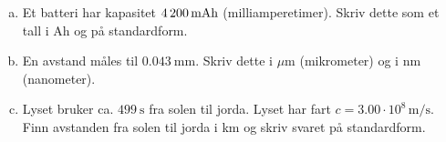 %
\begin{enumerate}[a)]
    \item Et batteri har kapasitet $4\,200\,\text{mAh}$ (milliamperetimer). Skriv dette som et tall i Ah og på standardform.
    \item En avstand måles til $\SI{0.043}{\milli\metre}$. Skriv dette i $\mu\textrm{m}$ (mikrometer) og i nm (nanometer).
    \item Lyset bruker ca. $\SI{499}{\second}$ fra solen til jorda. Lyset har fart $c = 3.00 \cdot 10^8\,\si{\metre\per\second}$. Finn avstanden fra solen til jorda i km og skriv svaret på standardform.
\end{enumerate}
